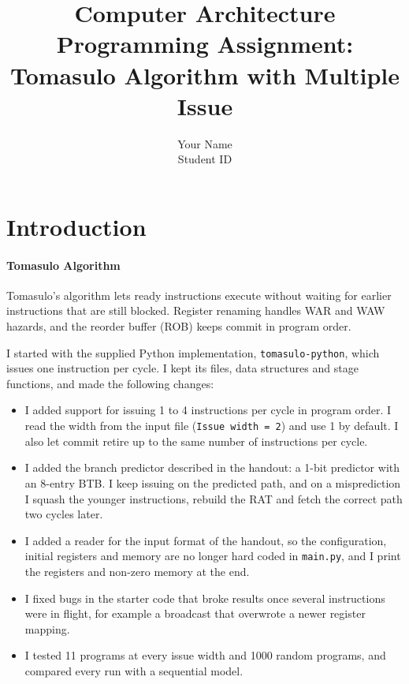 \documentclass[11pt]{article}
\title{Computer Architecture\\Programming Assignment: Tomasulo Algorithm with Multiple Issue}
\author{Your Name \\ Student ID}
\date{}
\renewcommand{\_}{\origunderscore\allowbreak}
\begin{document}
\maketitle
\thispagestyle{fancy}

\section{Introduction}

\paragraph{Tomasulo Algorithm} Tomasulo's algorithm lets ready instructions execute without
waiting for earlier instructions that are still blocked. Register renaming handles WAR and WAW
hazards, and the reorder buffer (ROB) keeps commit in program order.

I started with the supplied Python implementation, \texttt{tomasulo-python}, which issues one
instruction per cycle. I kept its files, data structures and stage functions, and made the
following changes:

\begin{itemize}
  \item I added support for issuing 1 to 4 instructions per cycle in program order. I read the
        width from the input file (\texttt{Issue width = 2}) and use 1 by default. I also let
        commit retire up to the same number of instructions per cycle.
  \item I added the branch predictor described in the handout: a 1-bit predictor with an
        8-entry BTB. I keep issuing on the predicted path, and on a misprediction I squash the
        younger instructions, rebuild the RAT and fetch the correct path two cycles later.
  \item I added a reader for the input format of the handout, so the configuration, initial
        registers and memory are no longer hard coded in \texttt{main.py}, and I print the
        registers and non-zero memory at the end.
  \item I fixed bugs in the starter code that broke results once several instructions were in
        flight, for example a broadcast that overwrote a newer register mapping.
  \item I tested 11 programs at every issue width and 1000 random programs, and compared every
        run with a sequential model.
\end{itemize}
\end{document}
